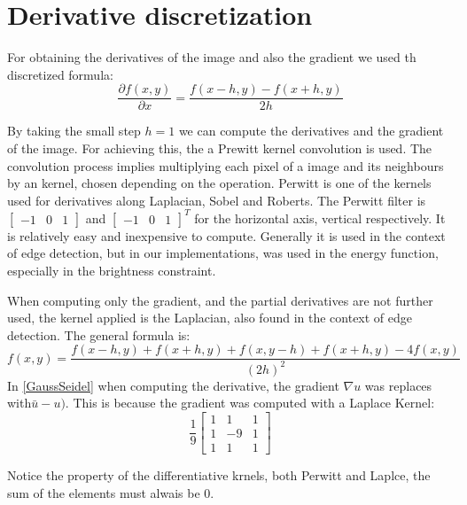 \documentclass[12pt,a4paper,twoside]{report}
\begin{document}
\section{Derivative discretization}

 For obtaining the derivatives of the image and also the gradient we used th discretized formula:
\begin{equation}
		\frac{\partial f(x, y)}{\partial x} =  \frac{f(x-h, y) - f(x+h,y)}{2h}
\end{equation}

By taking the small step $h = 1$ we can compute the derivatives and the gradient of the image.
For achieving this, the a Prewitt kernel convolution is used. The convolution process implies multiplying each pixel of a image and its neighbours by an kernel, chosen depending on the operation. Perwitt is one of the kernels used for derivatives along  Laplacian, Sobel and Roberts. The Perwitt filter is $\begin{bmatrix}-1 & 0 & 1\end{bmatrix}$ and  
$\begin{bmatrix}-1 & 0 & 1\end{bmatrix}^T$  for the horizontal axis, vertical respectively. It is relatively easy and inexpensive to compute. Generally it is used in the context of edge detection, but in our implementations, was used in the energy function, especially in the brightness constraint. 

When computing only the gradient, and the partial derivatives are not further used, the kernel applied is the Laplacian, also found in the context of edge detection. The general formula is:
\begin{equation}
f(x, y) =  \frac{f(x-h, y) + f(x+h,y) +f(x,y-h) +f(x+h,y) - 4f(x,y)}
{(2h)^2}
\end{equation}
 In \ref{GaussSeidel} when computing the derivative, the gradient $\nabla u$ was replaces with$\bar{u} - u)$. This is because the gradient was computed with a Laplace Kernel:
 \begin{equation}
 \frac{1}{9}
 \begin{bmatrix}
 	1 & 1 & 1 \\
 	1 & -9 & 1 \\
 	1 & 1 & 1
 \end{bmatrix}
 \end{equation}


Notice the property of the differentiative krnels, both Perwitt and Laplce, the sum of the elements must alwais be 0. 
\end{document}
